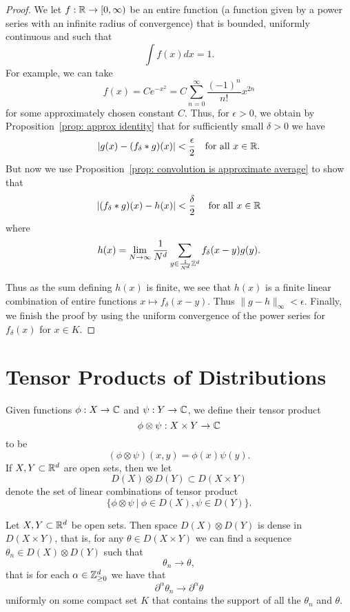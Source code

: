 \documentclass[twoside, a4paper, 10pt]{amsart}
\begin{document}
\begin{proof} We let $f:\mathbb{R} \to [0,\infty)$ be an entire function (a function given by a power series with an infinite radius of convergence) that is bounded, uniformly continuous and such that $$\int f(x) dx = 1.$$ For example, we can take $$f(x) = C e^{-x^2} = C \sum_{n=0}^{\infty} \frac{(-1)^n}{n!} x^{2n}$$ for some approximately chosen constant $C$. Thus, for $\epsilon>0$, we obtain by Proposition~\ref{prop: approx identity} that for sufficiently small $\delta>0$ we have $$|g(x) - (f_{\delta}*g)(x)| < \frac{\epsilon}{2} \quad \text{for all } x \in \mathbb{R}.$$ But now we use Proposition~\ref{prop: convolution is approximate average}  to show that $$|(f_{\delta}*g) (x) - h(x)| < \frac{\delta}{2} \quad \text{ for all } x \in \mathbb{R}$$ where $$h(x) = \lim_{N \to \infty} \frac{1}{N^d} \sum_{y \in \frac{1}{N^d}\mathbb{Z}^d} f_{\delta}(x-y) g(y). $$

Thus as the sum defining $h(x)$ is finite, we see that $h(x)$ is a finite linear combination of entire functions $x \mapsto f_{\delta}(x-y)$. Thus $\|g - h \|_{\infty} < \epsilon$. Finally, we finish the proof by using the uniform convergence of the power series for $f_{\delta}(x)$ for $x \in K$. \end{proof}

\section{Tensor Products of Distributions}

Given functions $\phi:X \to \mathbb{C}$ and $\psi:Y \to \mathbb{C}$, we define their tensor product $$\phi \otimes \psi:X \times Y \to \mathbb{C}$$ to be $$(\phi \otimes \psi)(x,y) = \phi(x) \psi(y).$$ If $X,Y \subset \mathbb{R}^d$ are open sets, then we let $$D(X) \otimes D(Y) \subset D(X \times Y)$$ denote the set of linear combinations of tensor product $$\{\phi \otimes \psi ~|~ \phi \in D(X), \psi \in D(Y) \}.$$

\begin{prop} Let $X,Y \subset \mathbb{R}^d$ be open sets. Then space $D(X) \otimes D(Y)$ is dense in $D(X \times Y)$, that is, for any $\theta \in D(X \times Y)$ we can find a sequence $\theta_n \in D(X) \otimes D(Y)$ such that $$\theta_n \to \theta,$$ that is for each $\alpha \in \mathbb{Z}^d_{\geq 0 }$ we have that $$\partial^{\alpha} \theta_n \to \partial^{\alpha} \theta$$ uniformly on some compact set $K$ that contains the support of all the $\theta_n$ and $\theta$.

\end{prop}
\end{document}
